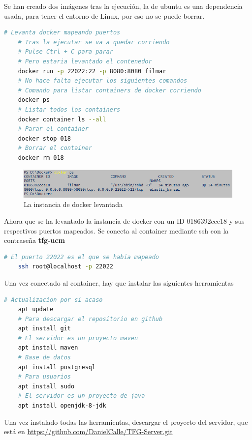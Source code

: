 Se han creado dos imágenes tras la ejecución, la de ubuntu es una dependencia usada, para tener el entorno de Linux, por eso no se puede borrar.

\begin{lstlisting}[language=bash, caption=Levantamiento de la instancia de docker]
    # Levanta docker mapeando puertos
    # Tras la ejecutar se va a quedar corriendo
    # Pulse Ctrl + C para parar
    # Pero estaria levantado el contenedor
    docker run -p 22022:22 -p 8080:8080 filmar 
    # No hace falta ejecutar los siguientes comandos
    # Comando para listar containers de docker corriendo
    docker ps 
    # Listar todos los containers
    docker container ls --all 
    # Parar el container
    docker stop 018 
    # Borrar el container
    docker rm 018 
\end{lstlisting}

\begin{figure}[H]
    \centering
    \includegraphics[width=6in]{figures/appendix-A/list-docker-containers.png}
    \caption{La instancia de docker levantada}
\end{figure}

Ahora que se ha levantado la instancia de docker con un ID 0186392cce18 y sus respectivos puertos mapeados.
Se conecta al container mediante ssh con la contraseña \textbf{tfg-ucm}

\begin{lstlisting}[language=bash, caption=Conexión ssh]
    # El puerto 22022 es el que se habia mapeado
    ssh root@localhost -p 22022
\end{lstlisting}

Una vez conectado al container, hay que instalar las siguientes herramientas

\begin{lstlisting}[language=bash, caption=Instalaciones]
    # Actualizacion por si acaso
    apt update 
    # Para descargar el repositorio en github
    apt install git
    # El servidor es un proyecto maven
    apt install maven
    # Base de datos
    apt install postgresql
    # Para usuarios
    apt install sudo
    # El servidor es un proyecto de java
    apt install openjdk-8-jdk
\end{lstlisting}

Una vez instalado todas las herramientas, descargar el proyecto del servidor,
que está en \url{https://github.com/DanielCalle/TFG-Server.git}

